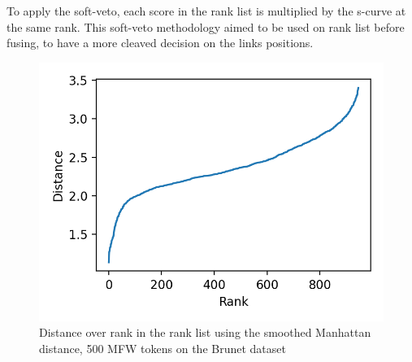 To apply the soft-veto, each score in the rank list is multiplied by the s-curve at the same rank.
This soft-veto methodology aimed to be used on rank list before fusing, to have a more cleaved decision on the links positions.

\begin{figure}
  \centering
  \caption{Distance over rank in the rank list using the smoothed Manhattan distance, 500 MFW tokens on the Brunet dataset}
  \label{fig:distance_over_rank}
  \includegraphics[width=\linewidth]{img/distance_over_rank.png}
\end{figure}


